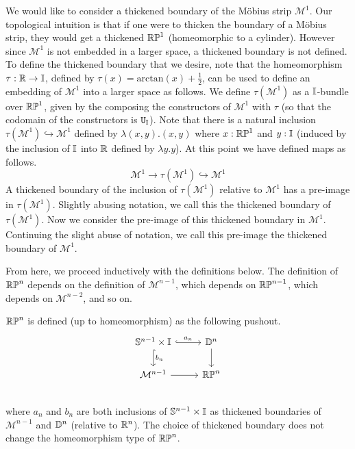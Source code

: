 \documentclass{amsart}
\begin{document}
We would like to consider a thickened boundary of the M\"{o}bius strip $\mathcal{M}^1$. Our topological intuition is that if one were to thicken the boundary of a M\"{o}bius strip, they would get a thickened $\mathbb{RP}^1$ (homeomorphic to a cylinder). However since $\mathcal{M}^1$ is not embedded in a larger space, a thickened boundary is not defined. To define the thickened boundary that we desire, note that the homeomorphism $\tau: \mathbb{R} \rightarrow \mathbb{I}$, defined by $\tau (x)=\text{arctan}(x)+ \frac{1}{2}$, can be used to define an embedding of $\mathcal{M}^1$ into a larger space as follows. We define $\tau(\mathcal{M}^1)$ as a $\mathbb{I}$-bundle over $\mathbb{RP}^1$, given by the composing the constructors of  $\mathcal{M}^1$ with $\tau$ (so that the codomain of the constructors is $\mathtt{U}_{\mathbb{I}}$).  Note that there is a natural inclusion $\tau(\mathcal{M}^1) \hookrightarrow \mathcal{M}^1$ defined by $\lambda (x, y). (x,y)$ where $x: \mathbb{RP}^1$ and $y : \mathbb{I}$ (induced by the inclusion of $\mathbb{I}$ into $\mathbb{R}$ defined by $\lambda y. y$). At this point we have defined maps as follows.
\[
\mathcal{M}^1 \rightarrow \tau(\mathcal{M}^1) \hookrightarrow \mathcal{M}^1
\]
A thickened boundary of the inclusion of $\tau(\mathcal{M}^1)$ relative to $\mathcal{M}^1$ has a pre-image in $\tau(\mathcal{M}^1)$. Slightly abusing notation, we call this the thickened boundary of $\tau(\mathcal{M}^1)$. Now we consider the pre-image of this thickened boundary in $\mathcal{M}^1$. Continuing the slight abuse of notation, we call this pre-image the thickened boundary of $\mathcal{M}^1$. 

From here, we proceed inductively with the definitions below. The definition of $\mathbb{RP}^n$ depends on the definition of $\mathcal{M}^{n-1}$, which depends on $\mathbb{RP}^{n-1}$, which depends on $\mathcal{M}^{n-2}$, and so on.

\begin{definition} $\mathbb{RP}^n$ is defined (up to homeomorphism) as the following pushout.\\
\[\begin{tikzcd}
\set{S}^{n-1} \times \set{I} \arrow[r, hook, "a_n"] \arrow[d, hook, "b_n" ] &\set{D}^{n} \arrow[d]\\
\mathcal{M}^{n-1} \arrow[r] &\set{RP}^n\\
\end{tikzcd}
\] where $a_n$ and $b_n$ are both inclusions of $\mathbb{S}^{n-1} \times \mathbb{I} $ as thickened boundaries of $\mathcal{M}^{n-1}$ and $\mathbb{D}^{n}$ (relative to $\mathbb{R}^n$). The choice of thickened boundary does not change the homeomorphism type of $\mathbb{RP}^n$.
\end{definition}
 
\end{document}
